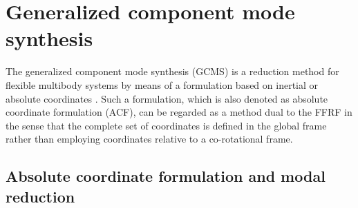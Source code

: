 \section{{Generalized component mode synthesis}} \label{sec-gcms}



The generalized component mode synthesis (GCMS) is a reduction method for flexible multibody systems by means of a formulation based on inertial or absolute coordinates \cite{gerstmayr2006}. 
Such a formulation, which is also denoted as absolute coordinate formulation (ACF), can be regarded as a method dual to the FFRF in the sense that the complete set of coordinates is defined in the global frame rather than employing coordinates relative to a co-rotational frame.

\subsection{Absolute coordinate formulation and modal reduction}


